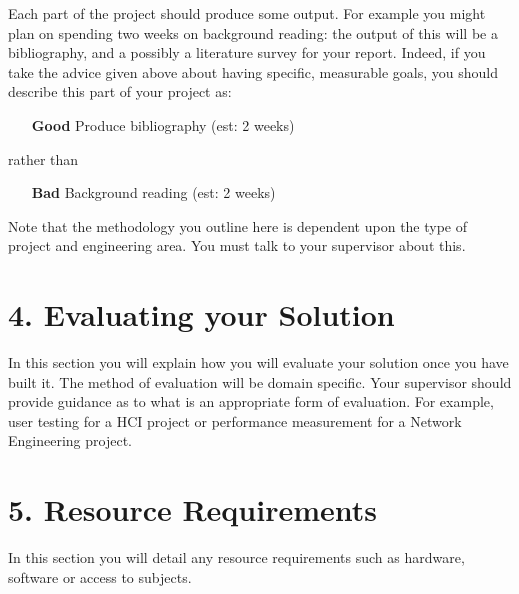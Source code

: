 \documentclass[11pt, a4paper, twoside, openright]{report}
\begin{document}
Each part of the project should produce some output. For example you
might plan on spending two weeks on background reading: the output of
this will be a bibliography, and a possibly a literature survey for
your report. Indeed, if you take the advice given above about having
specific, measurable goals, you should describe this part of your
project as:

\begin{itemize}
\item[\bf Good] Produce bibliography (est: 2 weeks)
\end{itemize}
rather than
\begin{itemize}
\item[\bf Bad] Background reading (est: 2 weeks)
\end{itemize}

Note that the methodology you outline here is dependent upon the type
of project and engineering area. You must talk to your supervisor
about this.

\section*{4. Evaluating your Solution}

In this section you will explain how you will evaluate your solution
once you have built it. The method of evaluation will be domain
specific. Your supervisor should provide guidance as to what is an
appropriate form of evaluation. For example, user testing for a HCI
project or performance measurement for a Network Engineering project.

\section*{5. Resource Requirements}

In this section you will detail any resource requirements such as
hardware, software or access to subjects.

\backmatter

%


\end{document}
